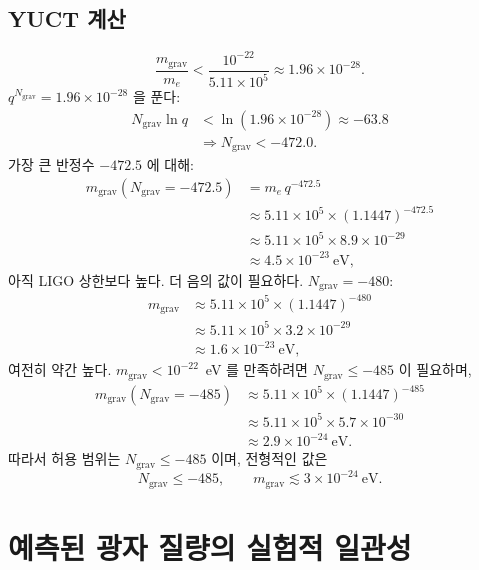 \documentclass[11pt,a4paper]{article}
\begin{document}
	\subsection{YUCT 계산}
	
	\[
	\frac{m_{\mathrm{grav}}}{m_e} < \frac{10^{-22}}{5.11\times10^5} \approx 1.96\times 10^{-28}.
	\]
	$q^{N_{\mathrm{grav}}} = 1.96\times10^{-28}$ 을 푼다:
	\[
	\begin{aligned}
		N_{\mathrm{grav}} \ln q &< \ln(1.96\times10^{-28}) \approx -63.8 \\
		&\Longrightarrow N_{\mathrm{grav}} < -472.0 .
	\end{aligned}
	\]
	가장 큰 반정수 $-472.5$ 에 대해:
	\[
	\begin{aligned}
		m_{\mathrm{grav}}(N_{\mathrm{grav}} = -472.5) &= m_e \, q^{-472.5} \\
		&\approx 5.11\times10^5 \times (1.1447)^{-472.5} \\
		&\approx 5.11\times10^5 \times 8.9\times10^{-29} \\
		&\approx 4.5 \times 10^{-23}~\mathrm{eV},
	\end{aligned}
	\]
	아직 LIGO 상한보다 높다. 더 음의 값이 필요하다. $N_{\mathrm{grav}} = -480$:
	\[
	\begin{aligned}
		m_{\mathrm{grav}} &\approx 5.11\times10^5 \times (1.1447)^{-480} \\
		&\approx 5.11\times10^5 \times 3.2\times10^{-29} \\
		&\approx 1.6 \times 10^{-23}~\mathrm{eV},
	\end{aligned}
	\]
	여전히 약간 높다. $m_{\mathrm{grav}} < 10^{-22}$~eV 를 만족하려면 $N_{\mathrm{grav}} \le -485$ 이 필요하며,
	\[
	\begin{aligned}
		m_{\mathrm{grav}}(N_{\mathrm{grav}} = -485) &\approx 5.11\times10^5 \times (1.1447)^{-485} \\
		&\approx 5.11\times10^5 \times 5.7\times10^{-30} \\
		&\approx 2.9 \times 10^{-24}~\mathrm{eV}.
	\end{aligned}
	\]
	따라서 허용 범위는 $N_{\mathrm{grav}} \le -485$ 이며, 전형적인 값은
	\[
	\boxed{N_{\mathrm{grav}} \le -485}, \qquad
	\boxed{m_{\mathrm{grav}} \lesssim 3 \times 10^{-24}~\mathrm{eV}} .
	\]
	
	\clearpage
	\section{예측된 광자 질량의 실험적 일관성}
	\label{sec:photon_consistency}
	
\end{document}
